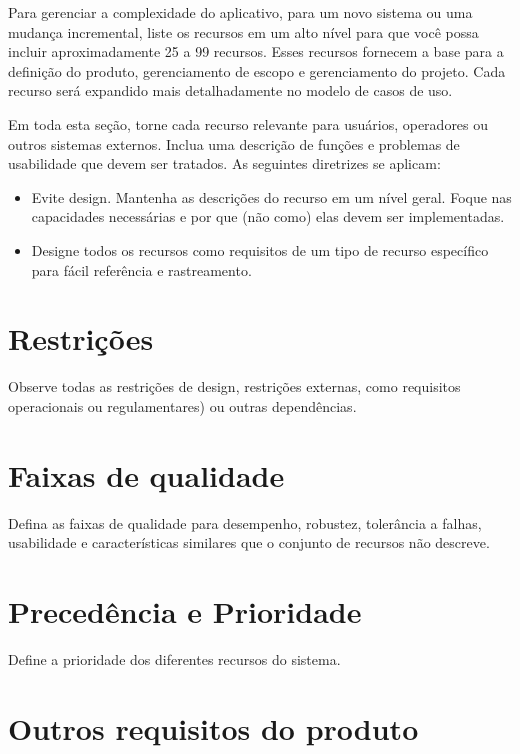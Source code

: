 \documentclass{report}
\begin{document}
Para gerenciar a complexidade do aplicativo, para um novo sistema ou uma
mudança incremental, liste os recursos em um alto nível para que você possa
incluir aproximadamente 25 a 99 recursos. Esses recursos fornecem a base para a
definição do produto, gerenciamento de escopo e gerenciamento do projeto. Cada
recurso será expandido mais detalhadamente no modelo de casos de uso.

Em toda esta seção, torne cada recurso relevante para usuários, operadores ou
outros sistemas externos. Inclua uma descrição de funções e problemas de
usabilidade que devem ser tratados. As seguintes diretrizes se aplicam:

\begin{itemize}

	\item
	      Evite design. Mantenha as descrições do recurso em um nível geral. Foque nas
	      capacidades necessárias e por que (não como) elas devem ser implementadas.

	\item
	      Designe todos os recursos como requisitos de um tipo de recurso específico para
	      fácil referência e rastreamento.

\end{itemize}

\chapter{Restrições}

Observe todas as restrições de design, restrições externas, como requisitos
operacionais ou regulamentares) ou outras dependências.

\chapter{Faixas de qualidade}

Defina as faixas de qualidade para desempenho, robustez, tolerância a falhas,
usabilidade e características similares que o conjunto de recursos não
descreve.

\chapter{Precedência e Prioridade}

Define a prioridade dos diferentes recursos do sistema.

\chapter{Outros requisitos do produto}
\end{document}
